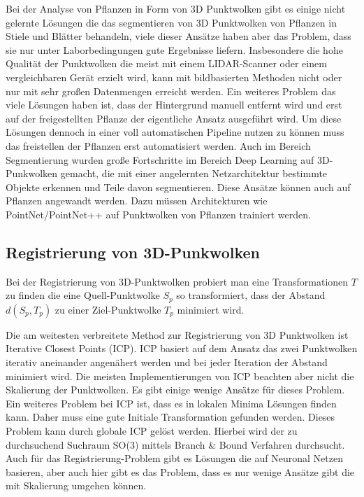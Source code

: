\documentclass[12pt,titlepage, twoside]{article}
\begin{document}
Bei der Analyse von Pflanzen in Form von 3D Punktwolken gibt es einige nicht gelernte Lösungen \cite{ThreeBasics} \cite{RegionGrowing} die das segmentieren von 3D Punktwolken von Pflanzen in Stiele und Blätter behandeln, viele dieser Ansätze haben aber das Problem, dass sie nur unter Laborbedingungen gute Ergebnisse liefern. 
Insbesondere die hohe Qualität der Punktwolken die meist mit einem LIDAR-Scanner oder einem vergleichbaren Gerät erzielt wird, kann mit bildbasierten Methoden nicht oder nur mit sehr großen Datenmengen erreicht werden. 
Ein weiteres Problem das viele Lösungen haben ist, dass der Hintergrund manuell entfernt wird und erst auf der freigestellten Pflanze der eigentliche Ansatz ausgeführt wird. 
Um diese Lösungen dennoch in einer voll automatischen Pipeline nutzen zu können muss das freistellen der Pflanzen erst automatisiert werden.
Auch im Bereich Segmentierung wurden große Fortschritte im Bereich Deep Learning auf 3D-Punkwolken gemacht, die mit einer angelernten Netzarchitektur bestimmte Objekte erkennen und Teile davon segmentieren. Diese Ansätze können auch auf Pflanzen angewandt werden. Dazu müssen Architekturen wie PointNet\cite{qi2017pointnet}/PointNet++\cite{qi2017pointnet++} auf Punktwolken von Pflanzen trainiert werden.  

\subsection{Registrierung von 3D-Punkwolken}
\label{sec:stand:registrierung}

Bei der Registrierung von 3D-Punktwolken probiert man eine Transformationen $T$ zu finden die eine Quell-Punktwolke $S_p$ so transformiert, dass der Abstand $d(S_p,T_p)$ zu einer Ziel-Punktwolke $T_p$ minimiert wird.

Die am weitesten verbreitete Method zur Registrierung von 3D Punktwolken ist Iterative Closest Points (ICP). ICP basiert auf dem Ansatz das zwei Punktwolken iterativ aneinander angenähert werden und bei jeder Iteration der Abstand minimiert wird.
Die meisten Implementierungen von ICP beachten aber nicht die Skalierung der Punktwolken. Es gibt einige wenige Ansätze für dieses Problem. 
Ein weiteres Problem bei ICP ist, dass es in lokalen Minima Lösungen finden kann. Daher muss eine gute Initiale Transformation gefunden werden. Dieses Problem kann durch globale ICP gelöst werden. Hierbei wird der zu durchsuchend Suchraum SO(3) mittels Branch \& Bound Verfahren durchsucht.
Auch für das Registrierung-Problem gibt es Lösungen die auf Neuronal Netzen basieren, aber auch hier gibt es das Problem, dass es nur wenige Ansätze gibt die mit Skalierung umgehen können.
\end{document}
